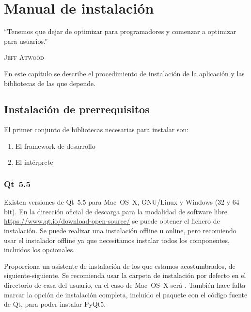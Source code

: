 
\chapter{Manual de instalación}

\epigraph{``Tenemos que dejar de optimizar para programadores y comenzar a optimizar para usuarios.''}{\textsc{Jeff Atwood}}

En este capítulo se describe el procedimiento de instalación de la aplicación y las bibliotecas de las que depende.

\section{Instalación de prerrequisitos}

El primer conjunto de bibliotecas necesarias para instalar son:
\begin{enumerate}
\item El framework de desarrollo 
\item El intérprete 
\end{enumerate}

\subsection{Qt~5.5}

Existen versiones de Qt~5.5 para Mac~OS~X, GNU/Linux y Windows (32 y 64 bit).
En la dirección oficial de descarga para la modalidad de software libre \url{https://www.qt.io/download-open-source/} se puede obtener el fichero de instalación. Se puede realizar una instalación offline u online, pero recomiendo usar el instalador offline ya que necesitamos instalar todos los componentes, incluidos los opcionales.

Proporciona un asistente de instalación de los que estamos acostumbrados, de siguiente-siguiente. Se recomienda usar la carpeta de instalación por defecto en el directorio de casa del usuario, en el caso de Mac~OS~X será . También hace falta marcar la opción de instalación completa, incluido el paquete con el código fuente de Qt, para poder instalar PyQt5.

